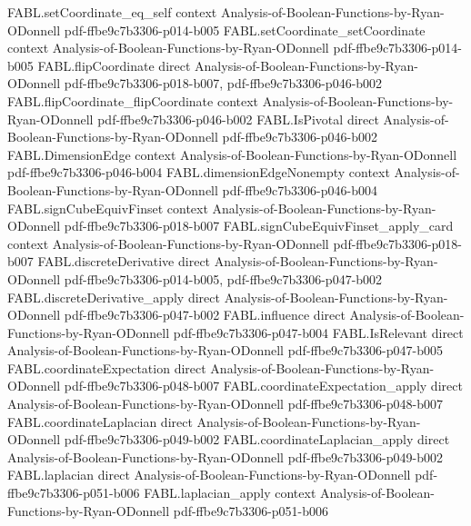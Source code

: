 \begin{theorem}
\proofstep
  {FABL.setCoordinate_eq_self}
  {context}
  {Analysis-of-Boolean-Functions-by-Ryan-ODonnell}
  {pdf-ffbe9c7b3306-p014-b005}
\proofstep
  {FABL.setCoordinate_setCoordinate}
  {context}
  {Analysis-of-Boolean-Functions-by-Ryan-ODonnell}
  {pdf-ffbe9c7b3306-p014-b005}
\proofstep
  {FABL.flipCoordinate}
  {direct}
  {Analysis-of-Boolean-Functions-by-Ryan-ODonnell}
  {pdf-ffbe9c7b3306-p018-b007,
    pdf-ffbe9c7b3306-p046-b002}
\proofstep
  {FABL.flipCoordinate_flipCoordinate}
  {context}
  {Analysis-of-Boolean-Functions-by-Ryan-ODonnell}
  {pdf-ffbe9c7b3306-p046-b002}
\proofstep
  {FABL.IsPivotal}
  {direct}
  {Analysis-of-Boolean-Functions-by-Ryan-ODonnell}
  {pdf-ffbe9c7b3306-p046-b002}
\proofstep
  {FABL.DimensionEdge}
  {context}
  {Analysis-of-Boolean-Functions-by-Ryan-ODonnell}
  {pdf-ffbe9c7b3306-p046-b004}
\proofstep
  {FABL.dimensionEdgeNonempty}
  {context}
  {Analysis-of-Boolean-Functions-by-Ryan-ODonnell}
  {pdf-ffbe9c7b3306-p046-b004}
\proofstep
  {FABL.signCubeEquivFinset}
  {context}
  {Analysis-of-Boolean-Functions-by-Ryan-ODonnell}
  {pdf-ffbe9c7b3306-p018-b007}
\proofstep
  {FABL.signCubeEquivFinset_apply_card}
  {context}
  {Analysis-of-Boolean-Functions-by-Ryan-ODonnell}
  {pdf-ffbe9c7b3306-p018-b007}
\proofstep
  {FABL.discreteDerivative}
  {direct}
  {Analysis-of-Boolean-Functions-by-Ryan-ODonnell}
  {pdf-ffbe9c7b3306-p014-b005,
    pdf-ffbe9c7b3306-p047-b002}
\proofstep
  {FABL.discreteDerivative_apply}
  {direct}
  {Analysis-of-Boolean-Functions-by-Ryan-ODonnell}
  {pdf-ffbe9c7b3306-p047-b002}
\proofstep
  {FABL.influence}
  {direct}
  {Analysis-of-Boolean-Functions-by-Ryan-ODonnell}
  {pdf-ffbe9c7b3306-p047-b004}
\proofstep
  {FABL.IsRelevant}
  {direct}
  {Analysis-of-Boolean-Functions-by-Ryan-ODonnell}
  {pdf-ffbe9c7b3306-p047-b005}
\proofstep
  {FABL.coordinateExpectation}
  {direct}
  {Analysis-of-Boolean-Functions-by-Ryan-ODonnell}
  {pdf-ffbe9c7b3306-p048-b007}
\proofstep
  {FABL.coordinateExpectation_apply}
  {direct}
  {Analysis-of-Boolean-Functions-by-Ryan-ODonnell}
  {pdf-ffbe9c7b3306-p048-b007}
\proofstep
  {FABL.coordinateLaplacian}
  {direct}
  {Analysis-of-Boolean-Functions-by-Ryan-ODonnell}
  {pdf-ffbe9c7b3306-p049-b002}
\proofstep
  {FABL.coordinateLaplacian_apply}
  {direct}
  {Analysis-of-Boolean-Functions-by-Ryan-ODonnell}
  {pdf-ffbe9c7b3306-p049-b002}
\proofstep
  {FABL.laplacian}
  {direct}
  {Analysis-of-Boolean-Functions-by-Ryan-ODonnell}
  {pdf-ffbe9c7b3306-p051-b006}
\proofstep
  {FABL.laplacian_apply}
  {context}
  {Analysis-of-Boolean-Functions-by-Ryan-ODonnell}
  {pdf-ffbe9c7b3306-p051-b006}
\proofstep

\end{theorem}
